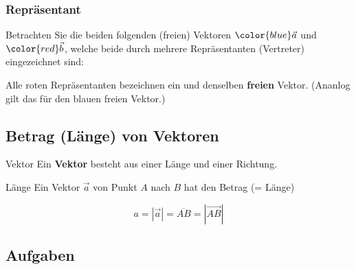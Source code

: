 


\subsubsection{Repräsentant}
Betrachten Sie die beiden folgenden (freien) Vektoren ${\color{blue} \vec{a}}$ und
${\color{red}\vec{b}}$, welche beide durch mehrere Repräsentanten
(Vertreter) eingezeichnet sind:


Alle {\color{red} roten} Repräsentanten bezeichnen ein und denselben
\textbf{freien} Vektor. (Ananlog gilt das für den {\color{blue} blauen} freien Vektor.)

\newpage


\subsection{Betrag (Länge) von Vektoren}




\begin{definition}{Vektor}{}
  Ein \textbf{Vektor} besteht aus einer Länge und einer Richtung.
\end{definition}


    \begin{definition}{Länge}{}
      Ein Vektor $\vec{a}$ von Punkt $A$ nach $B$ hat den Betrag (= Länge)

      $$a = |\vec{a}| = \overline{AB} = \left|\overrightarrow{AB}\right|$$
    \end{definition}


\subsection*{Aufgaben}\
\newpage
